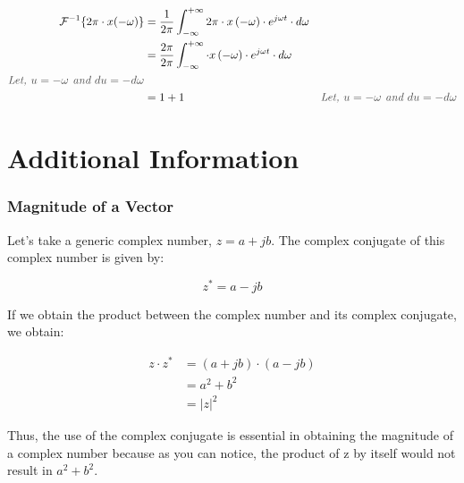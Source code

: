 \documentclass[letterpaper,12pt]{article}
\newcommand{\annot}[1]{\textcolor{darkgray}{\textit{#1}}}
\begin{document}
\begin{equation*}
    \begin{aligned}
        \mathcal{F}^{-1}\{2\pi\cdot x(-\omega)\} & = \frac{1}{2\pi}\int_{-\infty}^{+\infty}2\pi\cdot x\left(-\omega\right)\cdot e^{j\omega t}\cdot d\omega                                                \\
                                                 & = \frac{2\pi}{2\pi}\int_{-\infty}^{+\infty}\cdot x\left(-\omega\right)\cdot e^{j\omega t}\cdot d\omega                                                 \\
        \annot{Let, $u = -\omega$ and $du=-d\omega$}                                                                                                                                                      \\
                                                 & = 1+ 1                                                                                                  & \annot{Let, $u = -\omega$ and $du=-d\omega$}
    \end{aligned}
\end{equation*}

\newpage
\section*{Additional Information}
\subsubsection*{Magnitude of a Vector}\label{sec:magnitude_vector}

Let's take a generic complex number, $z = a + jb$. The complex conjugate of this complex number is given by:

\[z^{*} = a - jb\]

If we obtain the product between the complex number and its complex conjugate, we obtain:

\begin{align*}
    z\cdot z^{*} & = (a + jb)\cdot (a - jb) \\
                 & = a^2 + b^2              \\
                 & = |z|^2
    \label{eq:complex_conjugate}
\end{align*}

Thus, the use of the complex conjugate is essential in obtaining the magnitude of a complex number because as you can notice, the product of z by itself would not result in $a^2 + b^2$.
\end{document}
